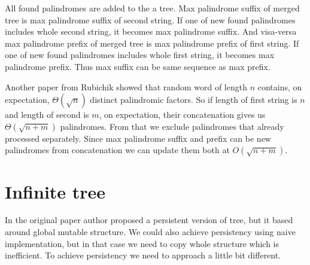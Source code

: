 All found palindromes are added to the a tree. Max palindrome suffix of merged tree is max palindrome suffix of second string. If one of new found palindromes includes whole second string, it becomes max palindrome suffix. And visa-versa max palindrome prefix of merged tree is max palindrome prefix of first string. If one of new found palindromes includes whole first string, it becomes max palindrome prefix. Thus max suffix can be same sequence as max prefix. 

Another paper from Rubichik \cite{rubinchik2016number} showed that random word of length $n$ contains, on expectation, $\Theta(\sqrt{n})$ distinct palindromic factors. So if length of first string is $n$ and length of second is $m$, on expectation, their concatenation gives us $\Theta(\sqrt{n + m})$ palindromes. From that we exclude palindromes that already processed separately. Since max palindrome suffix and prefix can be new palindromes from concatenation we can update them both at $O(\sqrt{n + m})$.   
\section{Infinite tree}
In the original paper author proposed a persistent version of tree, but it based around global mutable structure. We could also achieve persistency using naive implementation, but in that case we need to copy whole structure which is inefficient. To achieve persistency we need to approach a little bit different. 

